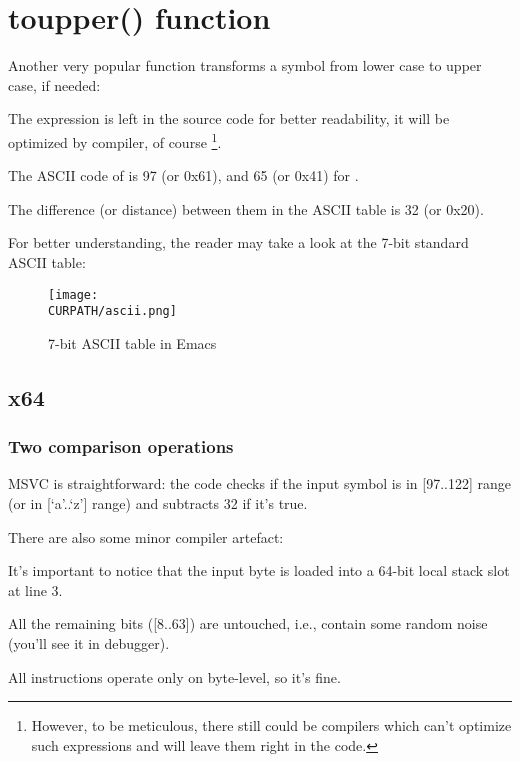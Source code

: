 \section{toupper() function}

Another very popular function transforms a symbol from lower case to upper case, if needed:



The  expression is left in the source code for better readability, it will be 
optimized by compiler, of course
\footnote{However, to be meticulous, there still could be compilers which can't optimize such expressions
and will leave them right in the code.}.

The \ac{ASCII} code of  is 97 (or 0x61), and 65 (or 0x41) for .

The difference (or distance) between them in the \ac{ASCII} table is 32 (or 0x20).

For better understanding, the reader may take a look at the 7-bit standard \ac{ASCII} table:

\begin{figure}[H]
\centering
\texttt{[image: \\CURPATH/ascii.png]}
\caption{7-bit \ac{ASCII} table in Emacs}
\end{figure}

\subsection{x64}

\subsubsection{Two comparison operations}

\NonOptimizing MSVC is straightforward: the code checks if the input symbol is in [97..122] range 
(or in [`a'..`z'] range) and subtracts 32 if it's true.

There are also some minor compiler artefact:



It's important to notice that the input byte is loaded into a 64-bit local stack slot at line 3.

All the remaining bits ([8..63]) are untouched, i.e., contain some random noise (you'll see it in debugger).

All instructions operate only on byte-level, so it's fine.

